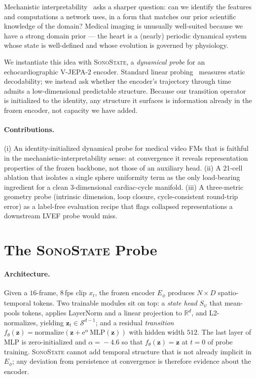 \documentclass[runningheads]{llncs}
\newcommand{\sonostate}{\textsc{SonoState}\xspace}
\begin{document}
Mechanistic interpretability~\cite{olah2020circuits,elhage2022solu}
asks a sharper question: can we identify the features and computations a
network uses, in a form that matches our prior scientific knowledge of the
domain? Medical imaging is unusually well-suited because we have a strong
domain prior --- the heart is a (nearly) periodic dynamical system whose
state is well-defined and whose evolution is governed by physiology.

We instantiate this idea with \sonostate, a \emph{dynamical probe} for an
echocardiographic V-JEPA-2 encoder. Standard linear
probing~\cite{alain2017probing} measures static decodability; we instead
ask whether the encoder's trajectory through time admits a low-dimensional
predictable structure. Because our transition operator is initialized to
the identity, any structure it surfaces is information already in the
frozen encoder, not capacity we have added.

\paragraph{Contributions.}
(i) An identity-initialized dynamical probe for medical video FMs that is
faithful in the mechanistic-interpretability sense: at convergence it
reveals representation properties of the frozen backbone, not those of an
auxiliary head. (ii) A 21-cell ablation that isolates a single sphere
uniformity term as the only load-bearing ingredient for a clean
$3$-dimensional cardiac-cycle manifold. (iii) A three-metric geometry
probe (intrinsic dimension, loop closure, cycle-consistent round-trip
error) as a label-free evaluation recipe that flags collapsed
representations a downstream LVEF probe would miss.

\section{The \sonostate Probe}

\paragraph{Architecture.}
Given a $16$-frame, $8$\,fps clip $x_t$, the frozen encoder $E_\phi$
produces $N{\times}D$ spatio-temporal tokens. Two trainable modules sit
on top: a \emph{state head} $S_\psi$ that mean-pools tokens, applies
LayerNorm and a linear projection to $\mathbb{R}^d$, and L2-normalizes,
yielding $\mathbf{z}_t \in \mathcal{S}^{d-1}$; and a residual
\emph{transition}
$f_\theta(\mathbf{z}) = \mathrm{normalize}(\mathbf{z} + \mathrm{e}^\alpha\,\mathrm{MLP}(\mathbf{z}))$
with hidden width $512$. The last layer of MLP is zero-initialized and
$\alpha\!=\!-4.6$ so that $f_\theta(\mathbf{z}) = \mathbf{z}$ at $t{=}0$
of probe training. \sonostate cannot add temporal structure that is not
already implicit in $E_\phi$; any deviation from persistence at
convergence is therefore evidence about the encoder.
\end{document}
